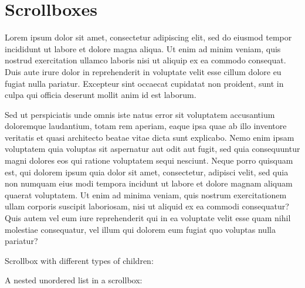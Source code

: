 \section{\label{scrollboxes}Scrollboxes}
\par Lorem ipsum dolor sit amet, consectetur adipiscing elit, sed do eiusmod tempor incididunt ut labore et dolore magna aliqua. Ut enim ad minim veniam, quis nostrud exercitation ullamco laboris nisi ut aliquip ex ea commodo consequat. Duis aute irure dolor in reprehenderit in voluptate velit esse cillum dolore eu fugiat nulla pariatur. Excepteur sint occaecat cupidatat non proident, sunt in culpa qui officia deserunt mollit anim id est laborum.
\par Sed ut perspiciatis unde omnis iste natus error sit voluptatem accusantium doloremque laudantium, totam rem aperiam, eaque ipsa quae ab illo inventore veritatis et quasi architecto beatae vitae dicta sunt explicabo. Nemo enim ipsam voluptatem quia voluptas sit aspernatur aut odit aut fugit, sed quia consequuntur magni dolores eos qui ratione voluptatem sequi nesciunt. Neque porro quisquam est, qui dolorem ipsum quia dolor sit amet, consectetur, adipisci velit, sed quia non numquam eius modi tempora incidunt ut labore et dolore magnam aliquam quaerat voluptatem. Ut enim ad minima veniam, quis nostrum exercitationem ullam corporis suscipit laboriosam, nisi ut aliquid ex ea commodi consequatur? Quis autem vel eum iure reprehenderit qui in ea voluptate velit esse quam nihil molestiae consequatur, vel illum qui dolorem eum fugiat quo voluptas nulla pariatur? 
\par Scrollbox with different types of children:
\par A nested unordered list in a scrollbox:

